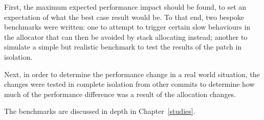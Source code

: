 First, the maximum expected performance impact should be found, to set an expectation of what the best case result would be. To that end, two bespoke benchmarks were written: one to attempt to trigger certain slow behaviours in the allocator that can then be avoided by stack allocating instead; another to simulate a simple but realistic benchmark to test the results of the patch in isolation.

Next, in order to determine the performance change in a real world situation, the  changes were tested in complete isolation from other commits to determine how much of the performance difference was a result of the allocation changes.

The benchmarks are discussed in depth in Chapter~\ref{studies}.

